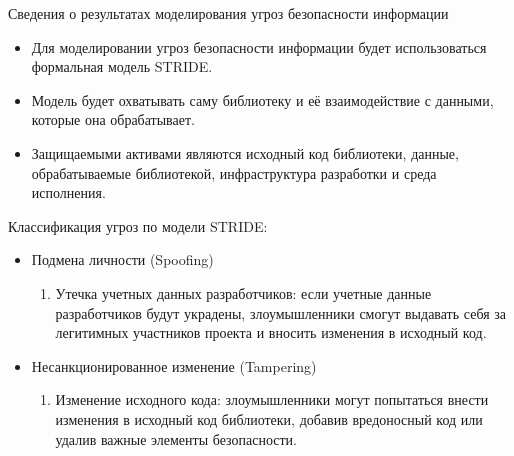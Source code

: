 \documentclass[10pt]{beamer}
\begin{document}
\begin{frame}{Сведения о результатах моделирования угроз безопасности информации}
    \begin{itemize}
        \item Для моделировании угроз безопасности информации будет использоваться формальная модель STRIDE.

        \item Модель будет охватывать саму библиотеку и её взаимодействие с данными, которые она обрабатывает.
        \item Защищаемыми активами являются исходный код библиотеки, данные, обрабатываемые библиотекой, инфраструктура разработки и среда исполнения.

    \end{itemize}

    Классификация угроз по модели STRIDE:
    \begin{itemize}
        \item Подмена личности (Spoofing)
        \begin{enumerate}
            \item Утечка учетных данных разработчиков: если учетные данные разработчиков будут украдены, злоумышленники смогут выдавать себя за легитимных участников проекта и вносить изменения в исходный код.
        \end{enumerate}

        \item Несанкционированное изменение (Tampering)
        \begin{enumerate}
            \item Изменение исходного кода: злоумышленники могут попытаться внести изменения в исходный код библиотеки, добавив вредоносный код или удалив важные элементы безопасности.
        \end{enumerate}
    \end{itemize}

\end{frame}
\end{document}
